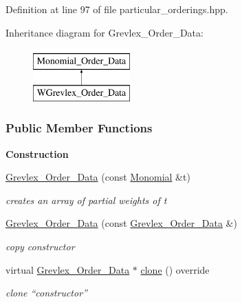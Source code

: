 Definition at line 97 of file particular\+\_\+orderings.\+hpp.

Inheritance diagram for Grevlex\+\_\+\+Order\+\_\+\+Data\+:\begin{figure}[H]
\begin{center}
\leavevmode
\includegraphics[height=2.000000cm]{group__orderinggroup}
\end{center}
\end{figure}
\subsubsection*{Public Member Functions}
\begin{Indent}\textbf{ Construction}\par
\begin{DoxyCompactItemize}
\item 
\hyperlink{group__orderinggroup_a61000659db1597c1fb7f149deb0d952c}{Grevlex\+\_\+\+Order\+\_\+\+Data} (const \hyperlink{group__polygroup_class_monomial}{Monomial} \&t)
\begin{DoxyCompactList}\small\item\em creates an array of partial weights of {\ttfamily t} \end{DoxyCompactList}\item 
\mbox{\label{group__orderinggroup_a53b3cafb2c36cea8c58aba05eeb422ea}} 
\hyperlink{group__orderinggroup_a53b3cafb2c36cea8c58aba05eeb422ea}{Grevlex\+\_\+\+Order\+\_\+\+Data} (const \hyperlink{group__orderinggroup_class_grevlex___order___data}{Grevlex\+\_\+\+Order\+\_\+\+Data} \&)
\begin{DoxyCompactList}\small\item\em copy constructor \end{DoxyCompactList}\item 
\mbox{\label{group__orderinggroup_a001fd11460120bb1df89f4960ec9d800}} 
virtual \hyperlink{group__orderinggroup_class_grevlex___order___data}{Grevlex\+\_\+\+Order\+\_\+\+Data} $\ast$ \hyperlink{group__orderinggroup_a001fd11460120bb1df89f4960ec9d800}{clone} () override
\begin{DoxyCompactList}\small\item\em clone ``constructor'' \end{DoxyCompactList}\end{DoxyCompactItemize}
\end{Indent}
